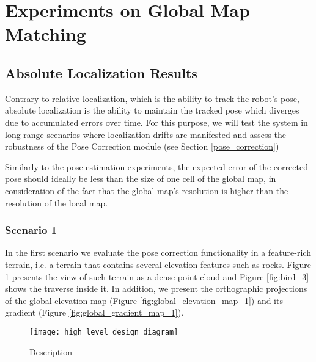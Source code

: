 
\section{Experiments on Global Map Matching}

\subsection{Absolute Localization Results}

Contrary to relative localization, which is the ability to track the robot's
pose, absolute localization is the ability to maintain the tracked pose
which diverges due to accumulated errors over time.
For this purpose, we will test the system in long-range
scenarios where localization drifts are manifested and assess the robustness
of the Pose Correction module (see Section \ref{pose_correction})

Similarly to the pose estimation experiments, the expected error of the
corrected pose should ideally be less than the size of one cell of the global
map, in consideration of the fact that the global map's resolution is higher
than the resolution of the local map.

\subsubsection{Scenario 1}

In the first scenario we evaluate the pose correction functionality in
a feature-rich terrain, i.e. a terrain that contains several elevation
features such as rocks.
Figure \ref{fig:terrain_3} presents the view of such terrain as a dense
point cloud and Figure \ref{fig:bird_3} shows the traverse inside it.
In addition, we present the orthographic projections of the global
elevation map (Figure \ref{fig:global_elevation_map_1}) and its gradient
(Figure \ref{fig:global_gradient_map_1}).

\begin{figure}
    \centering
    \texttt{[image: high\_level\_design\_diagram]}
    \caption[Name]{
        Description
    }
    \label{fig:terrain_3}
\end{figure}


